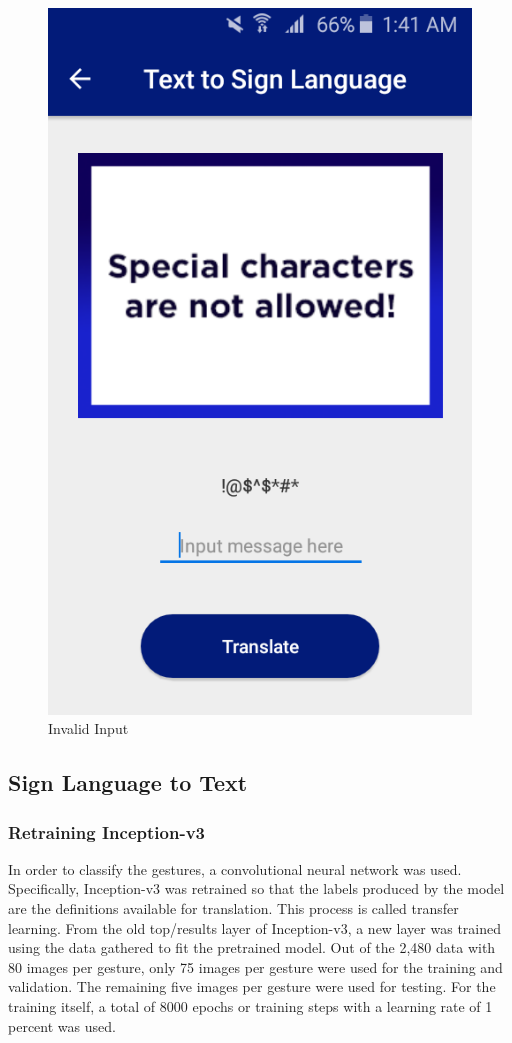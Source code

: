 \documentclass[journal]{./IEEE/IEEEtran}
\begin{document}
\begin{figure}[ht!]
    \centering
    \includegraphics[width=0.75\linewidth]{./images/screen_tts_error.png}
    \caption{Invalid Input}
    \label{fig:tts_error}
\end{figure}


\subsection{Sign Language to Text}
\subsubsection{Retraining Inception-v3}
In order to classify the gestures, a convolutional neural network was used. Specifically, Inception-v3 was retrained so that the labels produced by the model are the definitions available for translation.
\newline
\indent This process is called transfer learning. From the old top/results layer of Inception-v3, a new layer was trained using the data gathered to fit the pretrained model. Out of the 2,480 data with 80 images per gesture, only 75 images per gesture were used for the training and validation. The remaining five images per gesture were used for testing.
\newline
\indent For the training itself, a total of 8000 epochs or training steps with a learning rate of 1 percent was used.
\newline
\end{document}
